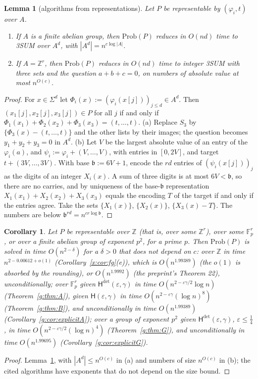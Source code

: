 \documentclass[11pt]{article}
\newtheorem{lemma}[theorem]{Lemma}
\newtheorem{corollary}[theorem]{Corollary}
\theoremstyle{definition}
\theoremstyle{remark}
\newcommand{\Z}{\mathbb{Z}}
\newcommand{\Fp}{\mathbb{F}_p}
\newcommand{\Prob}{\mathrm{Prob}}
\newcommand{\eps}{\varepsilon}
\newcommand{\Hyp}{\mathsf{H}}
\newcommand{\EpsGammaBest}{0.00612}%
\newcommand{\ExpBestUp}{1.99389}%
\newcommand{\ExpHalfBestUp}{1.99695}%
\begin{document}
\begin{lemma}[algorithms from representations]\label{g:lem:repalg}
Let $P$ be representable by $(\varphi_i,t)$ over $A$.
\begin{enumerate}[label=\textup{(\alph*)}]
\item If $A$ is a finite abelian group, then $\Prob(P)$ reduces in $O(nd)$ time to 3SUM over $A^d$, with $|A^d|=n^{c\log|A|}$.
\item If $A=\Z^r$, then $\Prob(P)$ reduces in $O(nd)$ time to integer 3SUM with three sets and the question $a+b+c=0$, on numbers of absolute value at most $n^{O(c)}$.
\end{enumerate}
\end{lemma}
\begin{proof}
For $x\in\Sigma^d$ let $\Phi_i(x):=(\varphi_i(x[j]))_{j\le d}\in A^d$. Then $(x_1[j],x_2[j],x_3[j])\in P$ for all $j$ if and only if $\Phi_1(x_1)+\Phi_2(x_2)+\Phi_3(x_3)=(t,\dots,t)$. (a) Replace $S_3$ by $\{\Phi_3(x)-(t,\dots,t)\}$ and the other lists by their images; the question becomes $y_1+y_2+y_3=0$ in $A^d$. (b) Let $V$ be the largest absolute value of an entry of the $\varphi_i(a)$, and $\psi_i:=\varphi_i+(V,\dots,V)$, with entries in $[0,2V]$, and target $t+(3V,\dots,3V)$. With base $\mathfrak b:=6V+1$, encode the $rd$ entries of $(\psi_i(x[j]))_j$ as the digits of an integer $X_i(x)$. A sum of three digits is at most $6V<\mathfrak b$, so there are no carries, and by uniqueness of the base-$\mathfrak b$ representation $X_1(x_1)+X_2(x_2)+X_3(x_3)$ equals the encoding $T$ of the target if and only if the entries agree. Take the sets $\{X_1(x)\}$, $\{X_2(x)\}$, $\{X_3(x)-T\}$. The numbers are below $\mathfrak b^{rd}=n^{cr\log\mathfrak b}$.
\end{proof}

\begin{corollary}\label{g:cor:repfast}
Let $P$ be representable over $\Z$ (that is, over some $\Z^r$), over some $\Fp^r$, or over a finite abelian group of exponent $p^2$, for a prime $p$. Then $\Prob(P)$ is solved in time $O(n^{2-\delta})$ for a $\delta>0$ that does not depend on $c$: over $\Z$ in time $n^{2-\EpsGammaBest+o(1)}$ (Corollary~\ref{x:cor:fg}(e)), which is $O(n^{\ExpBestUp})$ (the $o(1)$ is absorbed by the rounding), or $O(n^{1.9992})$ (the preprint's Theorem 22), unconditionally; over $\Fp^r$ given $\Hyp^{\det}(\eps,\gamma)$ in time $O(n^{2-\eps\gamma/2}\log n)$ (Theorem~\ref{g:thm:A}), given $\Hyp(\eps,\gamma)$ in time $O(n^{2-\eps\gamma}(\log n)^8)$ (Theorem~\ref{g:thm:B}), and unconditionally in time $O(n^{\ExpBestUp})$ (Corollary~\ref{g:cor:explicitA}); over a group of exponent $p^2$ given $\Hyp^{\det}(\eps,\gamma)$, $\eps\le\frac14$, in time $O(n^{2-\eps\gamma/2}(\log n)^4)$ (Theorem~\ref{g:thm:G}), and unconditionally in time $O(n^{\ExpHalfBestUp})$ (Corollary~\ref{g:cor:explicitG}).
\end{corollary}
\begin{proof}
Lemma~\ref{g:lem:repalg}, with $|A^d|\le n^{O(c)}$ in (a) and numbers of size $n^{O(c)}$ in (b); the cited algorithms have exponents that do not depend on the size bound.
\end{proof}
\end{document}
